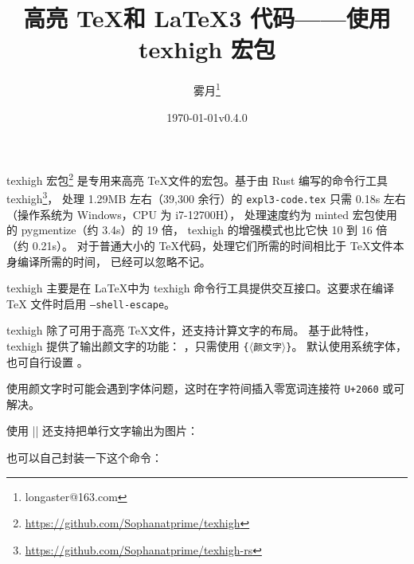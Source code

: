 \documentclass[zihao=-4,fontset=fandol]{ctexart}
\begin{document}
\title{高亮 \TeX 和 \LaTeX3 代码——使用\textsf{texhigh} 宏包}
\author{雾月\thanks{longaster@163.com}}
\date{\today\quad v0.4.0}
\maketitle

\textsf{texhigh} 宏包\footnote{\url{https://github.com/Sophanatprime/texhigh}}%
是专用来高亮 \TeX 文件的宏包。基于由 Rust 编写的命令行工具
texhigh\footnote{\url{https://github.com/Sophanatprime/texhigh-rs}}，
处理 1.29MB 左右（39,300 余行）的 \texttt{expl3-code.tex} 只需 0.18s 左右
（操作系统为 Windows，CPU 为 i7-12700H），
处理速度约为 \textsf{minted} 宏包使用的 pygmentize（约 3.4s）的 19 倍，
texhigh 的增强模式也比它快 10 到 16 倍（约 0.21s）。
对于普通大小的 \TeX 代码，处理它们所需的时间相比于 \TeX 文件本身编译所需的时间，
已经可以忽略不记。

\textsf{texhigh} 主要是在 \LaTeX 中为 texhigh 命令行工具提供交互接口。这要求在编译 \TeX
文件时启用 \texttt{--shell-escape}。

texhigh 除了可用于高亮 \TeX 文件，还支持计算文字的布局。
基于此特性，\textsf{texhigh} 提供了输出颜文字的功能：
 ，只需使用 \texhighverb{\kaomoji}\texttt\{\ensuremath{\langle}\verb|颜文字|\ensuremath{\rangle}\texttt\}。
默认使用系统字体，也可自行设置 。

\quad
{}\quad
{}\quad
{}\quad
{}

使用颜文字时可能会遇到字体问题，这时在字符间插入零宽词连接符 \texttt{U+2060} 或可解决。

使用 \texhighverb|\kaomoji*| 还支持把单行文字输出为图片：
\begin{examcode}[texhigh options={
  char-category*={emoji}{[\p{Emoji}--\p{ASCII}]}{\mbox{\emojifont #1}} %
}]{}

\end{examcode}

也可以自己封装一下这个命令：
\end{document}
